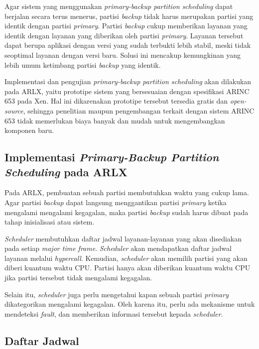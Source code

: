 Agar sistem yang menggunakan \textit{primary-backup partition scheduling} dapat berjalan secara
terus menerus, partisi \textit{backup} tidak harus merupakan partisi yang identik dengan partisi
\textit{primary}. Partisi \textit{backup} cukup memberikan layanan yang identik dengan layanan
yang diberikan oleh partisi \textit{primary}. Layanan tersebut dapat berupa aplikasi dengan
versi yang sudah terbukti lebih stabil, meski tidak seoptimal layanan dengan versi baru. Solusi
ini mencakup kemungkinan yang lebih umum ketimbang partisi \textit{backup} yang identik.

Implementasi dan pengujian \textit{primary-backup partition scheduling} akan dilakukan pada
ARLX, yaitu prototipe sistem yang bersesuaian dengan spesifikasi ARINC 653 pada Xen. Hal ini
dikarenakan prototipe tersebut tersedia gratis dan \textit{open-source}, sehingga penelitian
maupun pengembangan terkait dengan sistem ARINC 653 tidak memerlukan biaya banyak dan mudah
untuk mengembangkan komponen baru.

\subsection{Implementasi \textit{Primary-Backup Partition Scheduling} pada ARLX}

Pada ARLX, pembuatan sebuah partisi membutuhkan waktu yang cukup lama. Agar partisi
\textit{backup} dapat langsung menggantikan partisi \textit{primary} ketika mengalami mengalami
kegagalan, maka partisi \textit{backup} sudah harus dibuat pada tahap inisialisasi atau sistem.

\textit{Scheduler} membutuhkan daftar jadwal layanan-layanan yang akan disediakan pada setiap
\textit{major time frame}. \textit{Scheduler} akan mendapatkan daftar jadwal layanan melalui
\textit{hypercall}. Kemudian, \textit{scheduler} akan memilih partisi yang akan diberi kuantum
waktu CPU. Partisi hanya akan diberikan kuantum waktu CPU jika partisi tersebut tidak mengalami
kegagalan.

Selain itu, \textit{scheduler} juga perlu mengetahui kapan sebuah partisi \textit{primary}
dikategorikan mengalami kegagalan. Oleh karena itu, perlu ada mekanisme untuk mendeteksi
\textit{fault}, dan memberikan informasi tersebut kepada \textit{scheduler}.

\subsection{Daftar Jadwal}
\label{section:daftar_jadwal}

